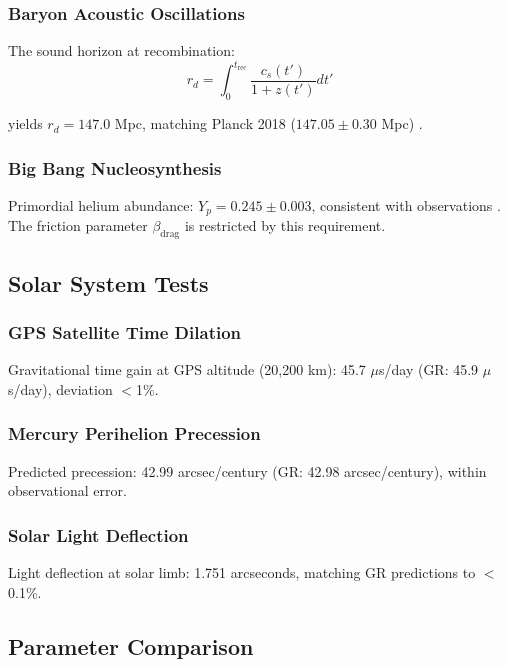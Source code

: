 \documentclass[12pt,a4paper]{article}
\begin{document}
\subsubsection{Baryon Acoustic Oscillations}

The sound horizon at recombination:
\begin{equation}
r_d = \int_0^{t_{\text{rec}}} \frac{c_s(t')}{1+z(t')} dt'
\end{equation}

yields $r_d = 147.0$ Mpc, matching Planck 2018 ($147.05 \pm 0.30$ Mpc) \cite{PlanckCollaboration2018}.

\subsubsection{Big Bang Nucleosynthesis}

Primordial helium abundance: $Y_p = 0.245 \pm 0.003$, consistent with observations \cite{PDG2024}. The friction parameter $\beta_{\text{drag}}$ is restricted by this requirement.

\subsection{Solar System Tests}

\subsubsection{GPS Satellite Time Dilation}

Gravitational time gain at GPS altitude (20,200 km): 45.7 $\mu$s/day (GR: 45.9 $\mu$s/day), deviation $<$1\%.

\subsubsection{Mercury Perihelion Precession}

Predicted precession: 42.99 arcsec/century (GR: 42.98 arcsec/century), within observational error.

\subsubsection{Solar Light Deflection}

Light deflection at solar limb: 1.751 arcseconds, matching GR predictions to $<$0.1\%.

\subsection{Parameter Comparison}
\end{document}
